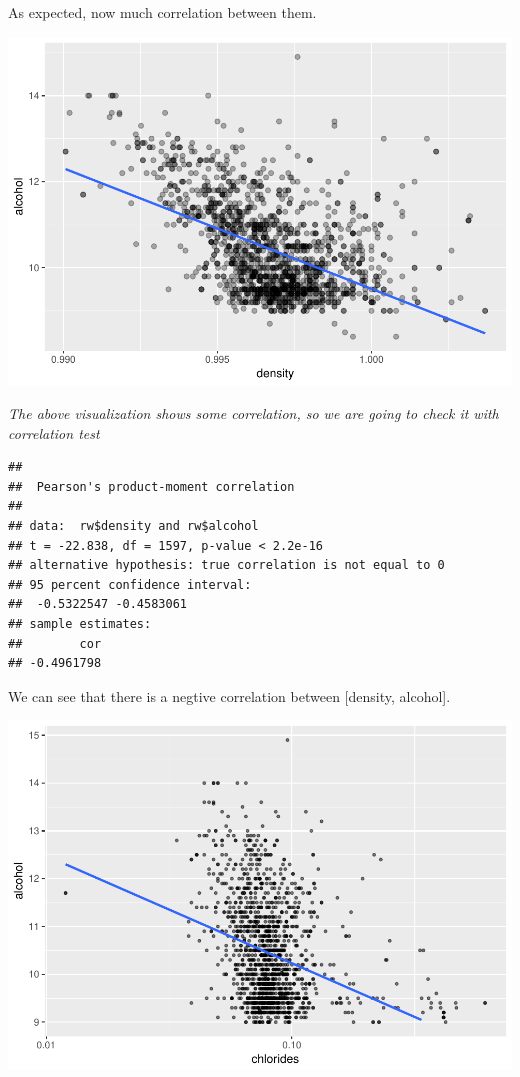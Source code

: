 \documentclass[]{article}
\begin{document}
As expected, now much correlation between them.

\includegraphics{RedWine_files/figure-latex/density_And_alcohol-1.pdf}

\emph{The above visualization shows some correlation, so we are going to
check it with correlation test}

\begin{verbatim}
## 
##  Pearson's product-moment correlation
## 
## data:  rw$density and rw$alcohol
## t = -22.838, df = 1597, p-value < 2.2e-16
## alternative hypothesis: true correlation is not equal to 0
## 95 percent confidence interval:
##  -0.5322547 -0.4583061
## sample estimates:
##        cor 
## -0.4961798
\end{verbatim}

We can see that there is a negtive correlation between {[}density,
alcohol{]}.

\includegraphics{RedWine_files/figure-latex/chlorides_And_alcohol-1.pdf}
\end{document}
